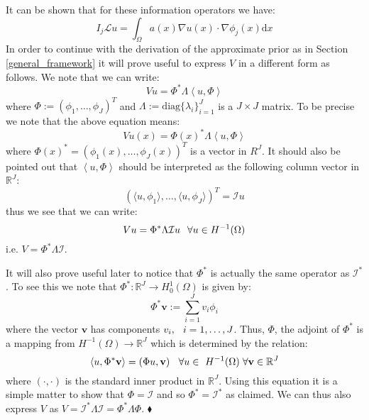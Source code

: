 It can be shown that for these information operators we have:
\begin{equation}
    \label{info_operator_with_pde_op}
    I_{j}\mathcal{L}u=\int_{\Omega}a(x)\nabla u(x)\cdot\nabla \phi_{j}(x)\mathrm{d}x
\end{equation}
In order to continue with the derivation of the approximate prior as in Section \textcolor{blue}{\ref{general_framework}} it will prove useful to express $V$ in a different form as follows. We note that we can write:
\begin{equation}
    Vu = \Phi^{*}\Lambda\left\langle u, \Phi\right\rangle
\end{equation}
where $\Phi:=(\phi_{1},\dots,\phi_{J})^{T}$ and $\Lambda:=\text{diag}\{\lambda_{i}\}_{i=1}^{J}$ is a $J\times J$ matrix. To be precise we note that the above equation means:
\begin{equation}
    Vu(x) = \Phi(x)^{*}\Lambda\left\langle u,\Phi\right\rangle
\end{equation}
where $\Phi(x)^{*}=(\phi_{1}(x),\dots,\phi_{J}(x))^{T}$ is a vector in $R^{J}$. It should also be pointed out that $\left\langle u,\Phi\right\rangle$ should be interpreted as the following column vector in $\mathbb{R}^{J}$:
\begin{equation}
    (\langle u,\phi_{1}\rangle,\dots,\langle u,\phi_{J}\rangle)^{T}=\mathcal{I}u
\end{equation}
thus we see that we can write:
\begin{equation}
    Vu=\Phi^{*}\Lambda\mathcal{I}u \hspace{0.25cm} \forall u\in H^{-1}(\Omega)
\end{equation}
i.e. $V=\Phi^{*}\Lambda\mathcal{I}$. \vspace{10pt}

\begin{remark}
    It will also prove useful later to notice that $\Phi^{*}$ is actually the same operator as $\mathcal{I}^{*}$. To see this we note that $\Phi^{*}:\mathbb{R}^{J}\rightarrow H_{0}^{1}(\Omega)$ is given by:
    \begin{equation}
        \Phi^{*}\mathbf{v}:=\sum_{i=1}^{J}v_{i}\phi_{i}
    \end{equation}
    where the vector $\mathbf{v}$ has components $v_{i}, \hspace{0.25cm} i=1,\dots,J$. Thus, $\Phi$, the adjoint of $\Phi^{*}$ is a mapping from $H^{-1}(\Omega)\rightarrow\mathbb{R}^{J}$ which is determined by the relation:
    \begin{equation}
        \langle u,\Phi^{*}\mathbf{v}\rangle = \left(\Phi u,\mathbf{v}\right) \hspace{0.25cm} \forall u\in\ H^{-1}(\Omega) \hspace{0.1cm} \forall \mathbf{v}\in\mathbb{R}^{J}
    \end{equation}
    where $(\boldsymbol{\cdot},\boldsymbol{\cdot})$ is the standard inner product in $\mathbb{R}^{J}$. Using this equation it is a simple matter to show that $\Phi=\mathcal{I}$ and so $\Phi^{*}=\mathcal{I}^{*}$ as claimed. We can thus also express $V$ as $V=\mathcal{I}^{*}\Lambda\mathcal{I}=\Phi^{*}\Lambda\Phi$.
    $\mathbin{\blacklozenge}$
\end{remark}

